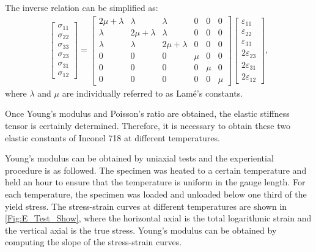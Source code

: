 The inverse relation can be simplified as:
\begin{eqnarray}
   \begin{bmatrix}\sigma_{11} \\ \sigma_{22} \\ \sigma_{33} \\ \sigma_{23} \\ \sigma_{31} \\ \sigma_{12} \end{bmatrix}
   =
   \begin{bmatrix} 2\mu+\lambda & \lambda & \lambda & 0 & 0 & 0 \\
                   \lambda & 2\mu+\lambda & \lambda & 0 & 0 & 0 \\
                   \lambda & \lambda & 2\mu+\lambda & 0 & 0 & 0 \\
                   0 & 0 & 0 & \mu & 0 & 0 \\
                   0 & 0 & 0 & 0 & \mu & 0 \\
                   0 & 0 & 0 & 0 & 0 & \mu \end{bmatrix}
    \begin{bmatrix}\varepsilon_{11} \\ \varepsilon_{22} \\ \varepsilon_{33} \\ 2\varepsilon_{23} \\ 2\varepsilon_{31} \\ 2\varepsilon_{12} \end{bmatrix},
\end{eqnarray}
where $\lambda$ and $\mu$ are individually referred to as Lam\'{e}'s constants.

Once Young's modulus and Poisson's ratio are obtained, the elastic stiffness tensor is certainly determined.
Therefore, it is necessary to obtain these two elastic constants of Inconel 718 at different temperatures.

Young's modulus can be obtained by uniaxial tests and the experiential procedure is as followed.
The specimen was heated to a certain temperature and held an hour to ensure that the temperature is uniform in the gauge length.
For each temperature, the specimen was loaded and unloaded below one third of the yield stress.
The stress-strain curves at different temperatures are shown in \ref{Fig:E_Test_Show}, where the horizontal axial is the total logarithmic strain and the vertical axial is the true stress.
Young's modulus can be obtained by computing the slope of the stress-strain curves.

